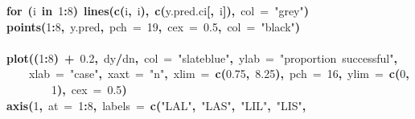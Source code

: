 \documentclass{article}
\makeatletter
\newcommand{\hlnumber}[1]{\textcolor[rgb]{0,0,0}{#1}}%
\newcommand{\hlfunctioncall}[1]{\textcolor[rgb]{.5,0,.33}{\textbf{#1}}}%
\newcommand{\hlstring}[1]{\textcolor[rgb]{.6,.6,1}{#1}}%
\newcommand{\hlkeyword}[1]{\textbf{#1}}%
\newcommand{\hlargument}[1]{\textcolor[rgb]{.69,.25,.02}{#1}}%
\newcommand{\hlsymbol}[1]{#1}%
\newcommand{\hlstd}[1]{\textcolor[rgb]{0,0,0}{#1}}%
\newenvironment{kframe}{%
 \def\FrameCommand##1{\hskip\@totalleftmargin \hskip-\fboxsep
 \colorbox{shadecolor}{##1}\hskip-\fboxsep
     \hskip-\linewidth \hskip-\@totalleftmargin \hskip\columnwidth}%
 \MakeFramed {\advance\hsize-\width
   \@totalleftmargin\z@ \linewidth\hsize
   \@setminipage}}%
 {\par\unskip\endMakeFramed}
\newenvironment{knitrout}{}{} %
\makeatother
\begin{document}
\begin{knitrout}
{\begin{kframe}
\begin{flushleft}
\hlstd{}\hlkeyword{for}{\ }\hlkeyword{(}\hlsymbol{i}{\ }\hlkeyword{in}{\ }\hlnumber{1}\hlkeyword{:}\hlnumber{8}\hlkeyword{)}{\ }\hlfunctioncall{lines}\hlkeyword{(}\hlfunctioncall{c}\hlkeyword{(}\hlsymbol{i}\hlkeyword{,}{\ }\hlsymbol{i}\hlkeyword{)}\hlkeyword{,}{\ }\hlfunctioncall{c}\hlkeyword{(}\hlsymbol{y.pred.ci}\hlkeyword{[}\hlkeyword{,}{\ }\hlsymbol{i}\hlkeyword{]}\hlkeyword{)}\hlkeyword{,}{\ }\hlargument{col}{\ }\hlargument{=}{\ }\hlstring{"{}grey"{}}\hlkeyword{)}\hspace*{\fill}\\
\hlstd{}\hlfunctioncall{points}\hlkeyword{(}\hlnumber{1}\hlkeyword{:}\hlnumber{8}\hlkeyword{,}{\ }\hlsymbol{y.pred}\hlkeyword{,}{\ }\hlargument{pch}{\ }\hlargument{=}{\ }\hlnumber{19}\hlkeyword{,}{\ }\hlargument{cex}{\ }\hlargument{=}{\ }\hlnumber{0.5}\hlkeyword{,}{\ }\hlargument{col}{\ }\hlargument{=}{\ }\hlstring{"{}black"{}}\hlkeyword{)}\hspace*{\fill}\\
\hlstd{}\hspace*{\fill}\\
\hlstd{}\hlfunctioncall{plot}\hlkeyword{(}\hlkeyword{(}\hlnumber{1}\hlkeyword{:}\hlnumber{8}\hlkeyword{)}{\ }\hlkeyword{+}{\ }\hlnumber{0.2}\hlkeyword{,}{\ }\hlsymbol{d}\hlkeyword{\usebox{\hlnormalsizeboxdollar}}\hlsymbol{y}\hlkeyword{/}\hlsymbol{d}\hlkeyword{\usebox{\hlnormalsizeboxdollar}}\hlsymbol{n}\hlkeyword{,}{\ }\hlargument{col}{\ }\hlargument{=}{\ }\hlstring{"{}slateblue"{}}\hlkeyword{,}{\ }\hlargument{ylab}{\ }\hlargument{=}{\ }\hlstring{"{}proportion{\ }successful"{}}\hlkeyword{,}\hspace*{\fill}\\
\hlstd{}{\ }{\ }{\ }{\ }\hlargument{xlab}{\ }\hlargument{=}{\ }\hlstring{"{}case"{}}\hlkeyword{,}{\ }\hlargument{xaxt}{\ }\hlargument{=}{\ }\hlstring{"{}n"{}}\hlkeyword{,}{\ }\hlargument{xlim}{\ }\hlargument{=}{\ }\hlfunctioncall{c}\hlkeyword{(}\hlnumber{0.75}\hlkeyword{,}{\ }\hlnumber{8.25}\hlkeyword{)}\hlkeyword{,}{\ }\hlargument{pch}{\ }\hlargument{=}{\ }\hlnumber{16}\hlkeyword{,}{\ }\hlargument{ylim}{\ }\hlargument{=}{\ }\hlfunctioncall{c}\hlkeyword{(}\hlnumber{0}\hlkeyword{,}\hspace*{\fill}\\
\hlstd{}{\ }{\ }{\ }{\ }{\ }{\ }{\ }{\ }\hlnumber{1}\hlkeyword{)}\hlkeyword{,}{\ }\hlargument{cex}{\ }\hlargument{=}{\ }\hlnumber{0.5}\hlkeyword{)}\hspace*{\fill}\\
\hlstd{}\hlfunctioncall{axis}\hlkeyword{(}\hlnumber{1}\hlkeyword{,}{\ }\hlargument{at}{\ }\hlargument{=}{\ }\hlnumber{1}\hlkeyword{:}\hlnumber{8}\hlkeyword{,}{\ }\hlargument{labels}{\ }\hlargument{=}{\ }\hlfunctioncall{c}\hlkeyword{(}\hlstring{"{}LAL"{}}\hlkeyword{,}{\ }\hlstring{"{}LAS"{}}\hlkeyword{,}{\ }\hlstring{"{}LIL"{}}\hlkeyword{,}{\ }\hlstring{"{}LIS"{}}\hlkeyword{,}\hspace*{\fill}\\

\end{flushleft}
\end{kframe}}
\end{knitrout}
\end{document}
